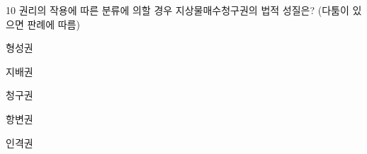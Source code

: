 \begin{question}{10}
권리의 작용에 따른 분류에 의할 경우 지상물매수청구권의 법적 성질은? (다툼이 있으면 판례에 따름)
\begin{choices}
  \item 형성권
  \item 지배권
  \item 청구권
  \item 항변권
  \item 인격권
\end{choices}
\end{question}
